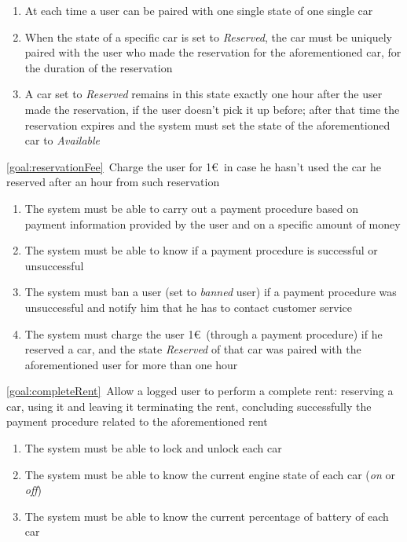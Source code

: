 \begin{description}
\begin{enumerate}[resume*]
 	  			\item At each time a user can be paired with one single state of one single car
 	  			\item When the state of a specific car is set to \emph{Reserved}, the car must be
 	  			uniquely paired with the user who made the reservation for the aforementioned car, for
 	  			the duration of the reservation
 	  			\item A car set to \emph{Reserved} remains in this state exactly one hour after the user
 	  			made the reservation, if the user doesn't pick it up before; after that time the reservation expires and the system
 	  			must set the state of the aforementioned car to \emph{Available}
   			\end{enumerate}
  		\item \ref{goal:reservationFee}\ Charge the user for 1\euro\ in case he hasn't used the car he reserved after an hour from such reservation
  			\begin{enumerate}[resume*]
  				\item The system must be able to carry out a payment procedure based on payment
  				information provided by the user and on a specific amount of money
  				\item The system must be able to know if a payment procedure is successful or
  				unsuccessful
  				\item The system must ban a user (set to \emph{banned} user) if a
  				payment procedure was unsuccessful and notify him that he has to
  				contact customer service
  				\item The system must charge the user 1\euro\ (through a payment procedure) if
  				he reserved a car, and the state \emph{Reserved} of that car was paired with the aforementioned
  				user for more than one hour
   			\end{enumerate}
  		\item \ref{goal:completeRent}\ Allow a logged user to perform a complete rent: reserving a car, using it and leaving it terminating the rent, concluding successfully the payment procedure related to the aforementioned rent
  			\begin{enumerate}[resume*]
  				\item The system must be able to lock and unlock each car
  				\item The system must be able to know the current engine state of each car
  				(\emph{on} or \emph{off})
  				\item The system must be able to know the current percentage of battery of each car

\end{enumerate}
\end{description}
